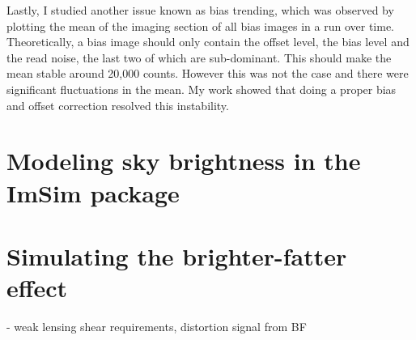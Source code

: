 Lastly, I studied another issue known as bias trending, which was observed by plotting the mean of the imaging section of all bias images in a run over time. Theoretically, a bias image should only contain the offset level, the bias level and the read noise, the last two of which are sub-dominant. This should make the mean stable around 20,000 counts. However this was not the case and there were significant fluctuations in the mean. My work showed that doing a proper bias and offset correction resolved this instability.

\section{Modeling sky brightness in the ImSim package}
\section{Simulating the brighter-fatter effect}

- weak lensing shear requirements, distortion signal from BF

